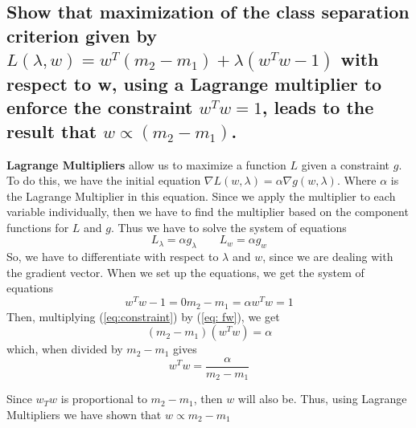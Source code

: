 \documentclass{article}
\begin{document}
	\subsection{Show that maximization of the class separation criterion given by 
		$L(\lambda, w) = w^{T}(m_{2} - m_{1})  + \lambda(w^{T}w - 1)$ with respect to w, using a
		Lagrange multiplier to enforce the constraint $w^{T}w = 1$, leads to the result that 
		$w \propto (m_{2} - m_{1})$.}

		\textbf{Lagrange Multipliers} allow us to maximize a function $L$ given a constraint $g$.
		To do this, we have  the initial equation $\nabla L(w, \lambda) = \alpha \nabla g(w, \lambda)$. Where 
		$\alpha$ is the Lagrange Multiplier in this equation. Since we apply the multiplier to each
		variable individually, then we have to find the multiplier based on the component functions 
		for $L$ and $g$. Thus we have to solve the system of equations 
		\[ L_{\lambda} = \alpha g_{\lambda} \quad\quad L_{w} = \alpha g_{w} \]
		So, we have to differentiate with respect to $\lambda$ and $w$, since we are dealing with the gradient
		vector. When we set up the equations, we get the system of equations
		\begin{subequations}
			\begin{equation}
				w^{T}w -1 = 0
			\end{equation}
			\begin{equation}
				\label{eq: fw}
				m_{2} - m_{1} = \alpha
			\end{equation}
			\begin{equation}
				\label{eq:constraint}
				w^{T}w = 1
			\end{equation}
		\end{subequations}
		Then, multiplying (\ref{eq:constraint}) by (\ref{eq: fw}), we get
		\[(m_{2} - m_{1})(w^{T}w) = \alpha\]
		which, when divided by $m_{2} - m_{1}$ gives 
		\[w^{T}w = \frac{\alpha}{m_{2} - m_{1}}\]

		Since $w_{T}w$ is proportional to $m_{2} - m_{1}$, then $w$ will also be. 
		Thus, using Lagrange Multipliers we have shown that $w \propto m_{2} - m_{1}$ 
\end{document}
